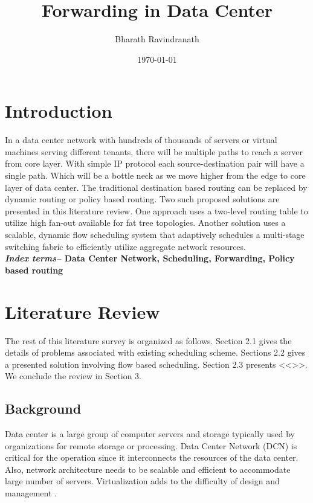 \documentclass[11pt,letterpaper,onecolumn]{article}
\title{Forwarding in Data Center}
\author{Bharath Ravindranath}
\date {\today}
\begin{document}
{\let\newpage\relax\maketitle}

\section{Introduction}
\justify
\par{\qquad In a data center network with hundreds of thousands of servers or virtual machines serving different tenants, there will be multiple paths to reach a server from core layer. With simple IP protocol each source-destination pair will have a single path. Which will be a bottle neck as we move higher from the edge to core layer of data center. The traditional  destination based routing can be replaced by dynamic routing or policy based routing. Two such proposed solutions are presented in this literature review. One approach uses a two-level routing table to utilize high fan-out available for fat tree topologies\cite{al2008scalable}. Another solution uses a scalable, dynamic flow scheduling system that adaptively schedules a multi-stage switching fabric to efficiently utilize aggregate network resources\cite{al2010hedera}.}
\\

\textbf{\textit{Index terms--} Data Center Network, Scheduling, Forwarding, Policy based routing}

\section{Literature Review}
\justify


\par{\qquad The rest of this literature survey is organized as follows. Section 2.1 gives the details of problems associated with existing scheduling scheme. Sections 2.2 gives a presented solution involving flow based scheduling. Section 2.3 presents <<>>. We conclude the review in Section 3.}


\subsection{Background}

\par{\qquad Data center is a large group of computer servers and storage typically used by organizations for remote storage or processing. Data Center Network (DCN) is critical for the operation since it interconnects the resources of the data center. Also, network architecture needs to be scalable and efficient to accommodate large number of servers. Virtualization adds to the difficulty of design and management \cite{wiki:001}.}\\
\end{document}
